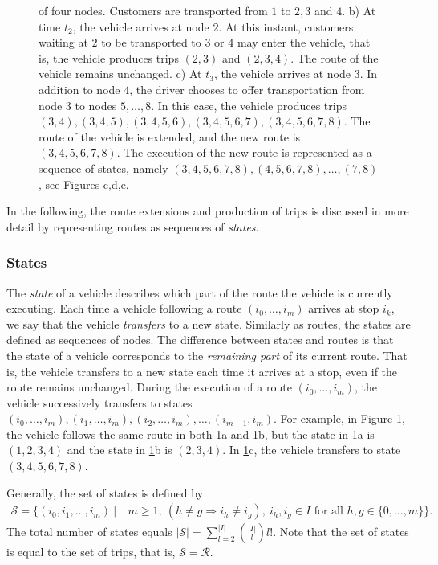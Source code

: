 \documentclass[dissertation,draft*]{aaltoseries}
\begin{document}
\begin{figure}[ht]
\begin{center}
{of four nodes. Customers are transported from $1$ to $2,3$ and $4$. b) At time $t_2$, the 
vehicle arrives at node $2$. At this instant, customers waiting at $2$ to be transported to $3$ or $4$ may enter the vehicle, that is, the vehicle 
produces trips $(2,3)$ and $(2,3,4)$. The route of the vehicle remains unchanged. c)
At $t_3$, the vehicle arrives at node $3$. In addition to node $4$, the driver chooses to offer transportation from node $3$ to nodes 
$5,\ldots,8$. In this case, the vehicle produces trips $(3,4),(3,4,5),(3,4,5,6),(3,4,5,6,7),(3,4,5,6,7,8)$.
The route of the vehicle is extended, and the new route is $(3,4,5,6,7,8)$. The execution of the
new route is represented as a sequence of states, namely $(3,4,5,6,7,8), (4,5,6,7,8), \ldots, (7,8)$,
see Figures c,d,e.
}
\label{esim01}
\end{center}
\end{figure}

In the following, the route extensions and production of trips is discussed in more detail
by representing routes as sequences of \emph{states}.


\subsubsection{States}
The \emph{state} of a vehicle describes which part of the route the vehicle is currently executing.
Each time a vehicle following a route $(i_0,\ldots,i_m)$ arrives at stop $i_k$, 
we say that the vehicle \emph{transfers} to a new state.
Similarly as routes, the states are defined as sequences of nodes.
The difference between states and routes
is that the state of a vehicle corresponds to the \emph{remaining part} of its current route. 
That is, the vehicle transfers to a new state each time it arrives at a stop, even if the route remains unchanged.
During the execution of a route $(i_0,\ldots,i_m)$, the vehicle successively transfers to states 
$(i_0,\ldots,i_m),(i_1,\ldots,i_m),(i_2,\ldots,i_m),\ldots,(i_{m-1},i_m)$.
For example, in Figure \ref{esim01}, the vehicle follows the same route in both \ref{esim01}a and \ref{esim01}b,
but the state in \ref{esim01}a is $(1,2,3,4)$ and the state in \ref{esim01}b is $(2,3,4)$. In \ref{esim01}c,
the vehicle transfers to state $(3,4,5,6,7,8)$.

Generally, the set of states is defined by
\begin{align*}
\mathcal{S} = \{ (i_0,i_1,\ldots, i_m) \ | \ & m \geq 1, \ (h \neq g \Rightarrow i_h \neq i_g), \ i_h,i_g \in I  \mbox{ for all } h,g \in \{0,\ldots,m\} \}.
\end{align*}
The total number of states equals $|\mathcal{S}| = \sum_{l=2}^{|I|} {|I| \choose l} l!$.
Note that the set of states is equal to the set of trips, that is, $\mathcal{S}=\mathcal{R}$.
\end{document}
